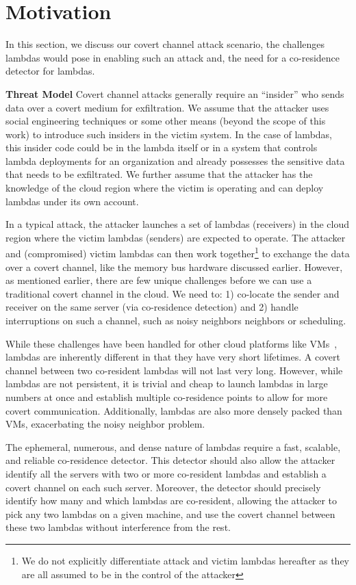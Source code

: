 
\section{Motivation}
\label{sec:motivation}

In this section, we discuss our covert channel attack scenario, the challenges
lambdas would pose in enabling such an attack and, the need for a co-residence
detector for lambdas.

\textbf{Threat Model}
Covert channel attacks generally require an ``insider'' who sends data over a
covert medium for exfiltration. We assume that the attacker uses social
engineering techniques or some other means (beyond the scope of this work) to
introduce  such insiders in the victim system. In the case of lambdas, this
insider code could be in the lambda itself or in a system that controls lambda
deployments for an organization and already possesses the sensitive data that
needs to be exfiltrated.  We further assume that the attacker has the knowledge
of the cloud region where the victim is operating and can deploy lambdas under
its own account.

In a typical attack, the attacker launches a set of lambdas (receivers) in the
cloud region where the victim lambdas (senders) are expected to operate. The
attacker and (compromised) victim lambdas can then work together\footnote{We
do not explicitly differentiate attack and victim lambdas hereafter as they are
all assumed to be in the control of the attacker} to exchange the data over a covert
channel, like the memory bus hardware discussed earlier.  However, as
mentioned earlier, there are few unique challenges before we can use a
traditional covert channel in the cloud. We need to: 1) co-locate the sender and
receiver on the same server (via co-residence detection) and 2)
handle interruptions on such a channel, such as noisy neighbors
neighbors or scheduling.

While these challenges have been handled for other cloud platforms like 
VMs~\cite{varad191016,wuusenix2012}, lambdas are inherently different in that they have very short
lifetimes. A covert channel between two co-resident lambdas will not last very
long. However, while lambdas are not persistent, it is trivial and cheap to
launch lambdas in large numbers at once and establish multiple co-residence
points to allow for more covert communication.  Additionally, lambdas are also
more densely packed than VMs, exacerbating the noisy neighbor problem.

The ephemeral, numerous, and dense nature of lambdas require a fast, scalable,
and reliable co-residence detector. This detector should also allow the attacker
identify all the servers with two or more co-resident lambdas and establish a
covert channel on each such server. Moreover, the detector should precisely
identify how many and which lambdas are co-resident, allowing the attacker to
pick any two lambdas on a given machine, and use the covert channel between
these two lambdas without interference from the rest. 



